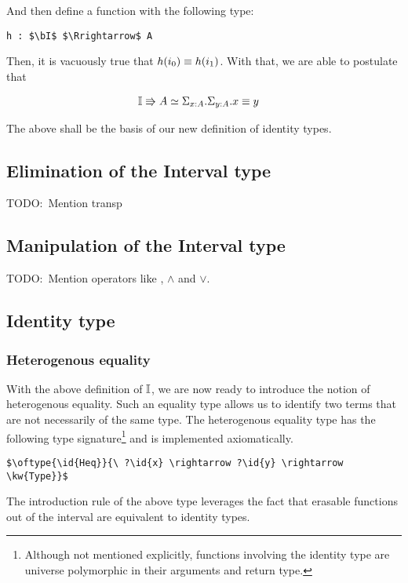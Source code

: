 \documentclass[11pt]{article}
\newcommand \kw[1] {\textsf{#1}}
\newcommand \id[1] {\textsl{#1}}
\begin{document}
And then define a function with the following type:

\begin{lstlisting}
h : $\bI$ $\Rrightarrow$ A
\end{lstlisting}

Then, it is vacuously true that $\eqtype{h(i_0)}{h(i_1)}$. With that, we are able to postulate that 

\begin{align*}
  & \bI \Rrightarrow A \simeq \Sigma_{\oftype{x}{A}} . \Sigma_{\oftype{y}{A}} . \eqtype{x}{y}
\end{align*}

The above shall be the basis of our new definition of identity types.

\subsection{Elimination of the Interval type}
TODO:\ Mention transp

\subsection{Manipulation of the Interval type}
TODO:\ Mention operators like $\!$, $\wedge$ and $\vee$.

\subsection{Identity type}

\subsubsection{Heterogenous equality}
With the above definition of $\mathbb{I}$, we are now ready to introduce the notion of heterogenous equality. Such an equality type allows us to identify two terms that are not necessarily of the same type. The heterogenous equality type has the following type signature\footnote{Although not mentioned explicitly, functions involving the identity type are universe polymorphic in their arguments and return type.} and is implemented axiomatically.

\begin{lstlisting}
$\oftype{\id{Heq}}{\ ?\id{x} \rightarrow ?\id{y} \rightarrow \kw{Type}}$
\end{lstlisting}

The introduction rule of the above type leverages the fact that erasable functions out of the interval are equivalent to identity types.
\end{document}
